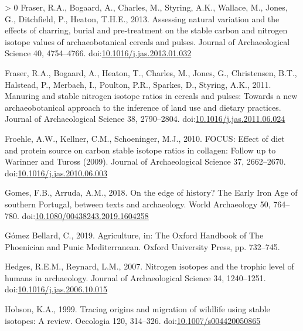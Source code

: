 \documentclass[3p]{elsarticle} %
\newlength{\cslhangindent}
\newenvironment{CSLReferences}[3] %
 {%
  \setlength{\parindent}{0pt}
  \ifodd #1 \everypar{\setlength{\hangindent}{\cslhangindent}}\ignorespaces\fi
  \ifnum #2 > 0
  \setlength{\parskip}{#2\baselineskip}
  \fi
 }%
 {}
\begin{document}
\begin{CSLReferences}{1}{0}
\leavevmode\hypertarget{ref-fraser_etal13a}{}%
Fraser, R.A., Bogaard, A., Charles, M., Styring, A.K., Wallace, M., Jones, G., Ditchfield, P., Heaton, T.H.E., 2013. Assessing natural variation and the effects of charring, burial and pre-treatment on the stable carbon and nitrogen isotope values of archaeobotanical cereals and pulses. Journal of Archaeological Science 40, 4754--4766. doi:\href{https://doi.org/10.1016/j.jas.2013.01.032}{10.1016/j.jas.2013.01.032}

\leavevmode\hypertarget{ref-fraser_etal11}{}%
Fraser, R.A., Bogaard, A., Heaton, T., Charles, M., Jones, G., Christensen, B.T., Halstead, P., Merbach, I., Poulton, P.R., Sparkes, D., Styring, A.K., 2011. Manuring and stable nitrogen isotope ratios in cereals and pulses: Towards a new archaeobotanical approach to the inference of land use and dietary practices. Journal of Archaeological Science 38, 2790--2804. doi:\href{https://doi.org/10.1016/j.jas.2011.06.024}{10.1016/j.jas.2011.06.024}

\leavevmode\hypertarget{ref-froehle_etal10}{}%
Froehle, A.W., Kellner, C.M., Schoeninger, M.J., 2010. {FOCUS}: Effect of diet and protein source on carbon stable isotope ratios in collagen: Follow up to {Warinner} and {Tuross} (2009). Journal of Archaeological Science 37, 2662--2670. doi:\href{https://doi.org/10.1016/j.jas.2010.06.003}{10.1016/j.jas.2010.06.003}

\leavevmode\hypertarget{ref-gomes_arruda18}{}%
Gomes, F.B., Arruda, A.M., 2018. On the edge of history? {The Early Iron Age} of southern {Portugal}, between texts and archaeology. World Archaeology 50, 764--780. doi:\href{https://doi.org/10.1080/00438243.2019.1604258}{10.1080/00438243.2019.1604258}

\leavevmode\hypertarget{ref-gomezbellard19}{}%
Gómez Bellard, C., 2019. Agriculture, in: The {Oxford Handbook} of {The Phoenician} and {Punic Mediterranean}. {Oxford University Press}, pp. 732--745.

\leavevmode\hypertarget{ref-hedges_reynard07}{}%
Hedges, R.E.M., Reynard, L.M., 2007. Nitrogen isotopes and the trophic level of humans in archaeology. Journal of Archaeological Science 34, 1240--1251. doi:\href{https://doi.org/10.1016/j.jas.2006.10.015}{10.1016/j.jas.2006.10.015}

\leavevmode\hypertarget{ref-hobson99}{}%
Hobson, K.A., 1999. Tracing origins and migration of wildlife using stable isotopes: A review. Oecologia 120, 314--326. doi:\href{https://doi.org/10.1007/s004420050865}{10.1007/s004420050865}


\end{CSLReferences}
\end{document}
